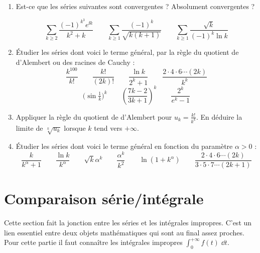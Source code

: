 \documentclass[class=report,crop=false]{standalone}
\begin{document}

\begin{miniexercices}
\begin{enumerate}

  \item Est-ce que les séries suivantes sont convergentes ?
  Absolument convergentes ?
  
  $$\sum_{k\geq 2} \frac{(-1)^{k^3}e^{\ii k}}{k^2+k}
  \qquad
  \sum_{k\geq 1} \frac{(-1)^k}{\sqrt{k(k+1)}}
  \qquad
  \sum_{k\geq 1} \frac{\sqrt k}{(-1)^k\ln k}$$
  
  \item \'Etudier les séries dont voici le terme général, par la règle du quotient de d'Alembert 
  ou des racines de Cauchy :
  $$\frac{k^{100}}{k!} \qquad \frac{k!}{(2k)!} \qquad 
  \frac{\ln k}{2^k+1} \qquad \frac{2\cdot 4 \cdot 6 \cdots (2k)}{k^k}$$
  $$\big(\sin \tfrac1k\big)^k \qquad 
  \left(\frac{7k-2}{3k+1}\right)^k \qquad \frac{2^k}{e^k-1}$$
  
  
  \item Appliquer la règle du quotient de d'Alembert pour $u_k = \frac{k!}{k^k}$.
  En déduire la limite de $\sqrt[k]{u_k}$ lorsque $k$ tend vers $+\infty$.
  
  \item \'Etudier les séries dont voici le terme général en 
  fonction du paramètre $\alpha > 0$ :
  $$\frac{k}{k^{\alpha}+1} \qquad \frac{\ln k}{k^\alpha} \qquad \sqrt{k}\alpha^k \qquad 
  \frac{\alpha^k}{k^2} \qquad \ln (1 + k^\alpha) 
  \qquad \frac{2\cdot 4 \cdot 6 \cdots (2k)}{3\cdot 5 \cdot 7 \cdots (2k+1)}
  $$
\end{enumerate}
\end{miniexercices}



\section{Comparaison série/intégrale}


Cette section fait la jonction entre les séries et les intégrales impropres.
C'est un lien essentiel entre deux objets mathématiques qui sont au final assez proches.
Pour cette partie il faut connaître les intégrales impropres $\int_0^{+\infty} f(t) \;\dd t$.
\end{document}
